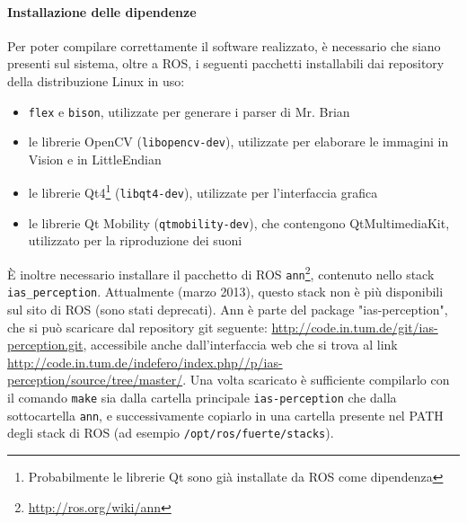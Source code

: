 \paragraph{Installazione delle dipendenze} Per poter compilare correttamente il software realizzato, è necessario che siano presenti sul sistema, oltre a ROS, i seguenti pacchetti installabili dai repository della distribuzione Linux in uso:
\begin{itemize}
\item \verb|flex| e \verb|bison|, utilizzate per generare i parser di Mr. Brian
\item le librerie OpenCV (\verb|libopencv-dev|), utilizzate per elaborare le immagini in Vision e in LittleEndian
\item le librerie Qt4\footnote{Probabilmente le librerie Qt sono già installate da ROS come dipendenza} (\verb|libqt4-dev|), utilizzate per l'interfaccia grafica
\item le librerie Qt Mobility (\verb|qtmobility-dev|), che contengono QtMultimediaKit, utilizzato per la riproduzione dei suoni
\end{itemize}

È inoltre necessario installare il pacchetto di ROS \verb|ann|\footnote{\url{http://ros.org/wiki/ann}}, contenuto nello stack \texttt{ias\_perception}. Attualmente (marzo 2013), questo stack non è più disponibili sul sito di ROS (sono stati deprecati). Ann è parte del package "ias-perception", che si può scaricare dal repository git seguente:
\url{http://code.in.tum.de/git/ias-perception.git}, accessibile anche dall'interfaccia web che si trova al link \url{http://code.in.tum.de/indefero/index.php//p/ias-perception/source/tree/master/}. Una volta scaricato è sufficiente compilarlo con il comando \verb|make| sia dalla cartella principale \verb|ias-perception| che dalla sottocartella \verb|ann|, e successivamente copiarlo in una cartella presente nel PATH degli stack di ROS (ad esempio \verb|/opt/ros/fuerte/stacks|).

